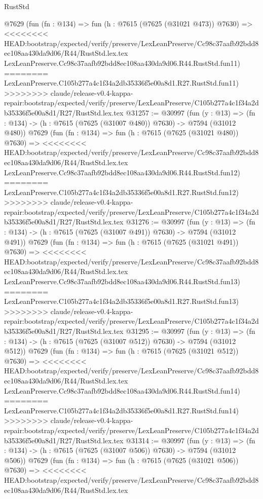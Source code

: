\begin{lexlean}{RustStd}
\begin{coremodule}
{\begin{coremodule}
{{{{{{{{{{{{{{{{{{{{{{{{{{{{{{{{{{    @7629
    (fun (fn : @134) =>
    fun (h : @7615 (@7625 (@31021 @473)) @7630) =>
<<<<<<<< HEAD:bootstrap/expected/verify/preserve/LexLeanPreserve/Cc98c37aafb92bdd8ec108aa430da9d06/R44/RustStd.lex.tex
    LexLeanPreserve.Cc98c37aafb92bdd8ec108aa430da9d06.R44.RustStd.fun11)
========
    LexLeanPreserve.C105b277a4c1f34a2db35336f5e00a8d1.R27.RustStd.fun11)
>>>>>>>> claude/release-v0.4-kappa-repair:bootstrap/expected/verify/preserve/LexLeanPreserve/C105b277a4c1f34a2db35336f5e00a8d1/R27/RustStd.lex.tex
@31257 := @30997
    (fun (y : @13) => (fn : @134) -> (h : @7615 (@7625 (@31007 @480)) @7630) -> @7594 (@31012 @480))
    @7629
    (fun (fn : @134) =>
    fun (h : @7615 (@7625 (@31021 @480)) @7630) =>
<<<<<<<< HEAD:bootstrap/expected/verify/preserve/LexLeanPreserve/Cc98c37aafb92bdd8ec108aa430da9d06/R44/RustStd.lex.tex
    LexLeanPreserve.Cc98c37aafb92bdd8ec108aa430da9d06.R44.RustStd.fun12)
========
    LexLeanPreserve.C105b277a4c1f34a2db35336f5e00a8d1.R27.RustStd.fun12)
>>>>>>>> claude/release-v0.4-kappa-repair:bootstrap/expected/verify/preserve/LexLeanPreserve/C105b277a4c1f34a2db35336f5e00a8d1/R27/RustStd.lex.tex
@31276 := @30997
    (fun (y : @13) => (fn : @134) -> (h : @7615 (@7625 (@31007 @491)) @7630) -> @7594 (@31012 @491))
    @7629
    (fun (fn : @134) =>
    fun (h : @7615 (@7625 (@31021 @491)) @7630) =>
<<<<<<<< HEAD:bootstrap/expected/verify/preserve/LexLeanPreserve/Cc98c37aafb92bdd8ec108aa430da9d06/R44/RustStd.lex.tex
    LexLeanPreserve.Cc98c37aafb92bdd8ec108aa430da9d06.R44.RustStd.fun13)
========
    LexLeanPreserve.C105b277a4c1f34a2db35336f5e00a8d1.R27.RustStd.fun13)
>>>>>>>> claude/release-v0.4-kappa-repair:bootstrap/expected/verify/preserve/LexLeanPreserve/C105b277a4c1f34a2db35336f5e00a8d1/R27/RustStd.lex.tex
@31295 := @30997
    (fun (y : @13) => (fn : @134) -> (h : @7615 (@7625 (@31007 @512)) @7630) -> @7594 (@31012 @512))
    @7629
    (fun (fn : @134) =>
    fun (h : @7615 (@7625 (@31021 @512)) @7630) =>
<<<<<<<< HEAD:bootstrap/expected/verify/preserve/LexLeanPreserve/Cc98c37aafb92bdd8ec108aa430da9d06/R44/RustStd.lex.tex
    LexLeanPreserve.Cc98c37aafb92bdd8ec108aa430da9d06.R44.RustStd.fun14)
========
    LexLeanPreserve.C105b277a4c1f34a2db35336f5e00a8d1.R27.RustStd.fun14)
>>>>>>>> claude/release-v0.4-kappa-repair:bootstrap/expected/verify/preserve/LexLeanPreserve/C105b277a4c1f34a2db35336f5e00a8d1/R27/RustStd.lex.tex
@31314 := @30997
    (fun (y : @13) => (fn : @134) -> (h : @7615 (@7625 (@31007 @506)) @7630) -> @7594 (@31012 @506))
    @7629
    (fun (fn : @134) =>
    fun (h : @7615 (@7625 (@31021 @506)) @7630) =>
<<<<<<<< HEAD:bootstrap/expected/verify/preserve/LexLeanPreserve/Cc98c37aafb92bdd8ec108aa430da9d06/R44/RustStd.lex.tex
}}}}}}}}}}}}}}}}}}}}}}}}}}}}}}}}}}
\end{coremodule}}
\end{coremodule}
\end{lexlean}
